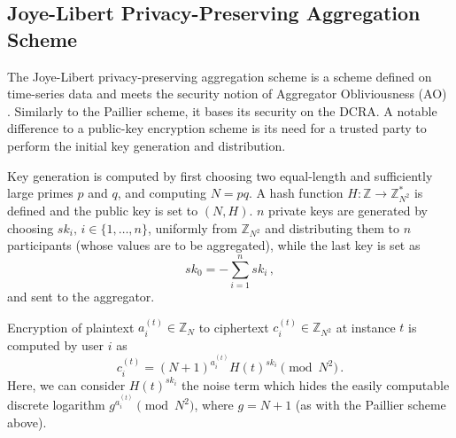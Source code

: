 \documentclass[10pt,letterpaper,oneside,twocolumn,journal]{IEEEtran}
\theoremstyle{definition}
\theoremstyle{definition}
\theoremstyle{remark}
\begin{document}
% 
% 

\subsection{Joye-Libert Privacy-Preserving Aggregation Scheme} \label{subsec:joye_libert_scheme}
The Joye-Libert privacy-preserving aggregation scheme \cite{joyeScalableSchemePrivacyPreserving2013} is a scheme defined on time-series data and meets the security notion of Aggregator Obliviousness (AO) \cite{shiPrivacyPreservingAggregationTimeSeries2011}. Similarly to the Paillier scheme, it bases its security on the DCRA. A notable difference to a public-key encryption scheme is its need for a trusted party to perform the initial key generation and distribution.

Key generation is computed by first choosing two equal-length and sufficiently large primes $p$ and $q$, and computing $N=pq$. A hash function $H:\mathbb{Z} \rightarrow \mathbb{Z}_{N^2}^*$ is defined and the public key is set to $(N, H)$. $n$ private keys are generated by choosing $sk_i,\,i\in\{1,\dots,n\}$, uniformly from $\mathbb{Z}_{N^2}$ and distributing them to $n$ participants (whose values are to be aggregated), while the last key is set as
\begin{equation}
    sk_0 = -\sum^{n}_{i=1}sk_i\,,
\end{equation}
and sent to the aggregator.

Encryption of plaintext $a^{(t)}_{i} \in \mathbb{Z}_N$ to ciphertext $c^{(t)}_{i} \in \mathbb{Z}_{N^2}$ at instance $t$ is computed by user $i$ as
\begin{equation}
    c^{(t)}_{i} = (N+1)^{a^{(t)}_{i}} H(t)^{sk_i} \pmod{N^2}\,.
\end{equation}
Here, we can consider $H(t)^{sk_i}$ the noise term which hides the easily computable discrete logarithm $g^{a^{(t)}_{i}} \pmod{N^2}$, where $g=N+1$ (as with the Paillier scheme above).
\end{document}
